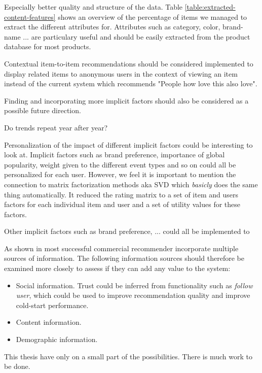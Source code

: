 Especially better quality and structure of the data. Table
\ref{table:extracted-content-features} shows an overview of the percentage of
items we managed to extract the different attributes for. Attributes such as
category, color, brand-name ...  are particulary useful and should be easily
extracted from the product database for most products.


Contextual item-to-item recommendations should be considered implemented to
display related items to anonymous users in the context of viewing an item
instead of the current system which recommends "People how love this also
love".

Finding and incorporating more implicit factors should also be considered as a
possible future direction.

Do trends repeat year after year?

Personalization of the impact of different implicit factors could be
interesting to look at.  Implicit factors such as brand preference, importance
of global popularity, weight given to the different event types and so on could
all be personalized for each user.  However, we feel it is important to mention
the connection to matrix factorization methods aka SVD which \emph{basicly}
does the same thing automatically. It reduced the rating matrix to a set of
item and users factors for each individual item and user and a set of utility
values for these factors.


Other implicit factors such as brand preference, ... could all be implemented
to

As shown in \cite{FranceTelecom} most successful commercial recommender
incorporate multiple sources of information. The following information sources
should therefore be examined more closely to assess if they can add any value
to the system:

\begin{itemize}
\item Social information. Trust could be inferred from functionality such as
\emph{follow user}, which could be used to improve recommendation quality and
improve cold-start performance.
\item Content information.
\item Demographic information.
\end{itemize}




This thesis have only on a small part of the possibilities. There is much work
to be done. %

